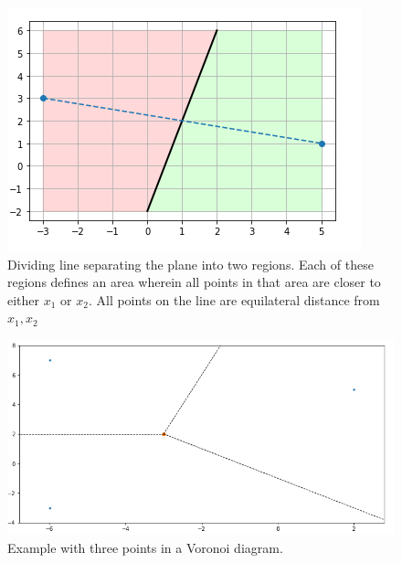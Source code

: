 \begin{figure}
\centerline{\includegraphics{images/plane_division.png}}
\caption{Dividing line separating the plane into two regions. Each of these regions defines an area wherein all points in that area are closer to either \(x_1\) or \(x_2\). All points on the line are equilateral distance from \(x_1, x_2\)}
\label{figPlanePDivider}
\end{figure}

\begin{figure}
\centerline{\includegraphics{images/plane_p_3.png}}
\caption{Example with three points in a Voronoi diagram.\newline}
\label{figPlaneP}
\end{figure}


\let\Oldsection\section
\renewcommand{\section}{\FloatBarrier\Oldsection}

\let\Oldsubsection\subsection
\renewcommand{\subsection}{\FloatBarrier\Oldsubsection}

